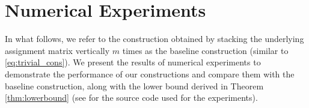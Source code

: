 \documentclass[journal,draftcls,onecolumn]{IEEEtran}
\theoremstyle{mystyle}
\newcommand{\sifat}[1]{\marginpar{+}{\bf Sifat's remark}: {\em #1}}
\begin{document}




















\section{Numerical Experiments}
\label{sec:numerical_exp}

In what follows, we refer to the construction obtained by stacking the underlying assignment matrix vertically $m$ times as the baseline construction (similar to  \eqref{eq:trivial_cons}). We present the results of numerical experiments to demonstrate the performance of our constructions and compare them with the baseline construction, along with the lower bound derived in Theorem \ref{thm:lowerbound} (see \cite{cE_agc_repo} for the source code used for the experiments). 

\end{document}

